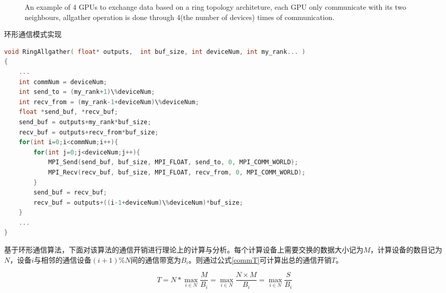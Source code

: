 \begin{figure}[tbh]%
\centering
{}
\caption{An example of 4 GPUs to exchange data based on a ring topology architeture, each GPU only communicate with its two neighbours, allgather operation is done through 4(the number of devices) times of communication.}
\label{allgather}
\end{figure}

\begin{table}
\caption{环形通信模式实现}
\label{ringAllgatherA}
\begin{lstlisting}[language=C++, basicstyle=\ttfamily\footnotesize]
void RingAllgather( float* outputs,  int buf_size, int deviceNum, int my_rank... )
{
	...
	int commNum = deviceNum;
	int send_to = (my_rank+1)\%deviceNum;
	int recv_from = (my_rank-1+deviceNum)\%deviceNum;
	float *send_buf, *recv_buf;
	send_buf = outputs+my_rank*buf_size;
	recv_buf = outputs+recv_from*buf_size;
	for(int i=0;i<commNum;i++){	
		for(int j=0;j<deviceNum;j++){
			MPI_Send(send_buf, buf_size, MPI_FLOAT, send_to, 0, MPI_COMM_WORLD);
			MPI_Recv(recv_buf, buf_size, MPI_FLOAT, recv_from, 0, MPI_COMM_WORLD);
		}
		send_buf = recv_buf;
		recv_buf = outputs+((i-1+deviceNum)\%deviceNum)*buf_size;
	}
	...
}
\end{lstlisting}
\end{table}

基于环形通信算法，下面对该算法的通信开销进行理论上的计算与分析。每个计算设备上需要交换的数据大小记为$M$，计算设备的数目记为$N$，设备$i$与相邻的通信设备$(i+1)\%N$间的通信带宽为$B_i$。则通过公式\ref{commT}可计算出总的通信开销$T$。

\begin{equation}
\label{commT}
T = N*\max_{i \in N}{\dfrac{M}{B_i}} = \max_{i \in N}{\dfrac{N\times M}{B_i}} = \max_{i \in N}{\dfrac{S}{B_i}}
\end{equation}

